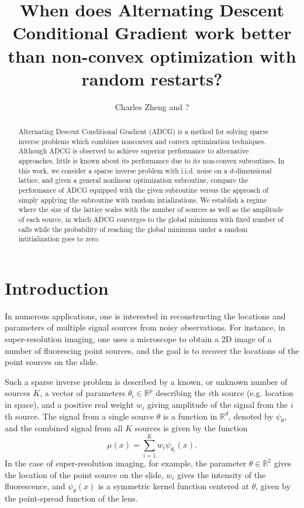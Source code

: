 \documentclass[11pt]{article}
\begin{document}
\newcommand{\tr}{\text{tr}}
\newcommand{\E}{\textbf{E}}
\newcommand{\diag}{\text{diag}}
\newcommand{\argmax}{\text{argmax}}
\newcommand{\argmin}{\text{argmin}}
\newcommand{\Cov}{\text{Cov}}
\newcommand{\Var}{\text{Var}}
\newcommand{\Vol}{\text{Vol}}
\newcommand{\HH}{\boldsymbol{H}}

\title{When does Alternating Descent Conditional Gradient work better than non-convex optimization with random restarts?}

\author{Charles Zheng and ?}

\maketitle

\begin{abstract}
Alternating Descent Conditional Gradient (ADCG) is a method for
solving sparse inverse problems which combines nonconvex and convex
optimization techniques.  Although ADCG is observed to achieve
superior performance to alternative approaches, little is known about
its performance due to its non-convex subroutines.  In this work, we
consider a sparse inverse problem with i.i.d. noise on a
$d$-dimensional lattice, and given a general nonlinear optimization
subroutine, compare the performance of ADCG equipped with the given
subroutine versus the approach of simply applying the subroutine with
random intializations.  We establish a regime where the size of the
lattice scales with the number of sources as well as the amplitude of
each source, in which ADCG converges to the global minimum with fixed
number of calls while the probability of reaching the global minimum
under a random intitialization goes to zero.
\end{abstract}

\section{Introduction}

In numerous applications, one is interested in reconstructing the
locations and parameters of multiple signal sources from noisy
observations.  For instance, in super-resolution imaging, one uses a
microscope to obtain a 2D image of a number of fluorescing point sources,
and the goal is to recover the locations of the point sources on the
slide.

Such a sparse inverse problem is described by a known,
or unknown number of sources $K$, a vector of parameters $\theta_i \in
\mathbb{R}^p$ describing the $i$th source (e.g. location in space),
and a positive real weight $w_i$ giving amplitude of the signal from
the $i$th source.  The signal from a single source $\theta$ is a
function in $\mathbb{R}^d$, denoted by $\psi_\theta$,
and the combined signal from all $K$ sources is given by the function
\[
\mu(x) = \sum_{i=1}^K w_i \psi_{\theta_i}(x).
\]
In the case of super-resolution imaging, for example, the parameter
$\theta \in \mathbb{R}^2$ gives the location of the point source on
the slide, $w_i$ gives the intensity of the fluorescence, and
$\psi_{\theta}(x)$ is a symmetric kernel function centered at $\theta$,
given by the point-spread function of the lens.
\end{document}
